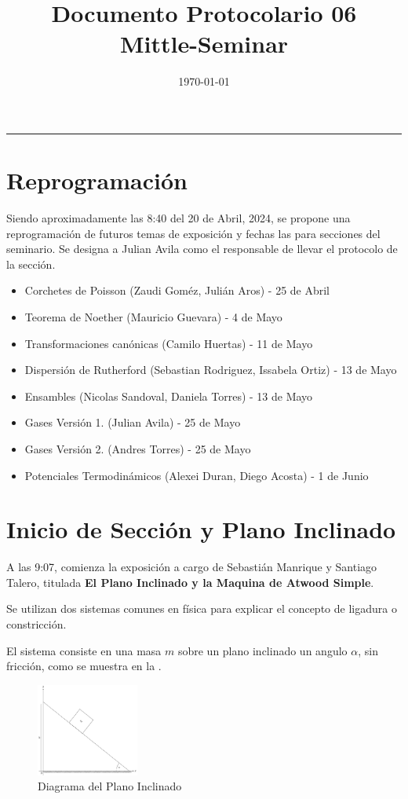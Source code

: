 \documentclass{article}
\title{\textbf{Documento Protocolario 06}\\ \small{Mittle-Seminar}}
\date{\today}
\theoremstyle{definition}
\begin{document}
\maketitle
\thispagestyle{fancy}
\hrule

\section{Reprogramación}
Siendo aproximadamente las 8:40 del 20 de Abril, 2024, se propone una reprogramación de futuros temas de exposición y fechas las para secciones del seminario. Se designa a Julian Avila como el responsable de llevar el protocolo de la sección.

\begin{itemize}
	\item Corchetes de Poisson (Zaudi Goméz, Julián Aros) - 25 de Abril
	\item Teorema de Noether (Mauricio Guevara) - 4 de Mayo
	\item Transformaciones canónicas (Camilo Huertas) - 11 de Mayo
	\item Dispersión de Rutherford (Sebastian Rodriguez, Issabela Ortiz) - 13 de Mayo
	\item Ensambles (Nicolas Sandoval, Daniela Torres) - 13 de Mayo
	\item Gases Versión 1. (Julian Avila) - 25 de Mayo
	\item Gases Versión 2. (Andres Torres) - 25 de Mayo
	\item Potenciales Termodinámicos (Alexei Duran, Diego Acosta) - 1 de Junio
\end{itemize}


\section{Inicio de Sección y Plano Inclinado}
A las 9:07, comienza la exposición a cargo de Sebastián Manrique y Santiago Talero, titulada \textbf{El Plano Inclinado y la Maquina de Atwood Simple}.

Se utilizan dos sistemas comunes en física para explicar el concepto de ligadura o constricción.

El sistema consiste en una masa $m$ sobre un plano inclinado un angulo $\alpha$, sin fricción, como se muestra en la .

\begin{figure}[H]
	\centering
	\includegraphics[width=0.30\textwidth]{./Images/inclined-plane.pdf}
	\caption{Diagrama del Plano Inclinado}
	\label{fig:inclained_plane}
\end{figure}
\end{document}
